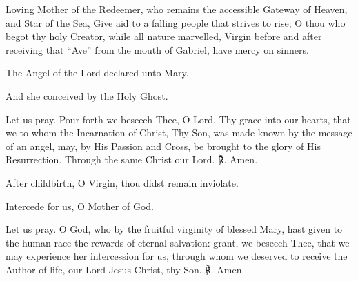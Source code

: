 \begin{enpars}\noindent Loving Mother of the Redeemer, 
who remains the accessible Gateway of Heaven,
and Star of the Sea,
Give aid to a falling people 
that strives to rise;
O thou who begot thy holy Creator,
while all nature marvelled,
Virgin before and after
receiving that ``Ave'' from the mouth of Gabriel,
have mercy on sinners.


\noindent \vv The Angel of the Lord declared unto Mary.

\noindent \rr And she conceived by the Holy Ghost.

\noindent Let us pray. Pour forth we beseech Thee, O Lord, Thy grace into our hearts, that we to whom the Incarnation of Christ, Thy Son, was made known by the message of an angel, may, by His Passion and Cross, be brought to the glory of His Resurrection. Through the same Christ our Lord. ℟. Amen.


\noindent \vv After childbirth, O Virgin, thou didst remain inviolate.

\noindent \rr Intercede for us, O Mother of God.

\noindent Let us pray. O God, who by the fruitful virginity of blessed Mary, hast given to the human race the rewards of eternal salvation: grant, we beseech Thee, that we may experience her intercession for us, through whom we deserved to receive the Author of life, our Lord Jesus Christ, thy Son. ℟. Amen.
\end{enpars}